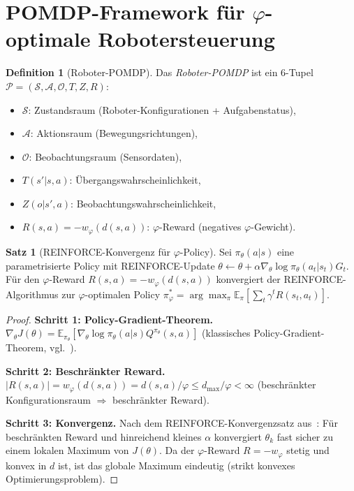 ﻿\documentclass[a4paper,12pt]{article}
\theoremstyle{definition}
\newtheorem{definition}{Definition}
\newtheorem{satz}{Satz}
\begin{document}
\section{POMDP-Framework f\"ur $\varphi$-optimale Robotersteuerung}

\begin{definition}[Roboter-POMDP]
\label{def:robot_pomdp}
Das \emph{Roboter-POMDP} ist ein 6-Tupel
$\mathcal{P} = (\mathcal{S}, \mathcal{A}, \mathcal{O}, T, Z, R)$:
\begin{itemize}
    \item $\mathcal{S}$: Zustandsraum (Roboter-Konfigurationen + Aufgabenstatus),
    \item $\mathcal{A}$: Aktionsraum (Bewegungsrichtungen),
    \item $\mathcal{O}$: Beobachtungsraum (Sensordaten),
    \item $T(s'|s,a)$: \"Ubergangswahrscheinlichkeit,
    \item $Z(o|s',a)$: Beobachtungswahrscheinlichkeit,
    \item $R(s,a) = -w_\varphi(d(s,a))$: $\varphi$-Reward (negatives $\varphi$-Gewicht).
\end{itemize}
\end{definition}

\begin{satz}[REINFORCE-Konvergenz f\"ur $\varphi$-Policy]
\label{satz:reinforce}
Sei $\pi_\theta(a|s)$ eine parametrisierte Policy mit REINFORCE-Update
$\theta \leftarrow \theta + \alpha \nabla_\theta \log \pi_\theta(a_t|s_t) G_t$.
F\"ur den $\varphi$-Reward $R(s,a) = -w_\varphi(d(s,a))$ konvergiert
der REINFORCE-Algorithmus zur $\varphi$-optimalen Policy
$\pi^*_\varphi = \arg\max_\pi \mathbb{E}_\pi[\sum_t \gamma^t R(s_t,a_t)]$.
\end{satz}

\begin{proof}
\textbf{Schritt 1: Policy-Gradient-Theorem.}
$\nabla_\theta J(\theta) = \mathbb{E}_{\pi_\theta}[\nabla_\theta \log\pi_\theta(a|s) Q^{\pi_\theta}(s,a)]$
(klassisches Policy-Gradient-Theorem, vgl.~\cite{sutton1999}).

\textbf{Schritt 2: Beschr\"ankter Reward.}
$|R(s,a)| = w_\varphi(d(s,a)) = d(s,a)/\varphi \leq d_{\max}/\varphi < \infty$
(beschr\"ankter Konfigurationsraum $\Rightarrow$ beschr\"ankter Reward).

\textbf{Schritt 3: Konvergenz.}
Nach dem REINFORCE-Konvergenzsatz aus~\cite{epp2026hetnet}:
F\"ur beschr\"ankten Reward und hinreichend kleines $\alpha$ konvergiert
$\theta_k$ fast sicher zu einem lokalen Maximum von $J(\theta)$.
Da der $\varphi$-Reward $R = -w_\varphi$ stetig und konvex in $d$ ist,
ist das globale Maximum eindeutig (strikt konvexes Optimierungsproblem).
\end{proof}
\end{document}
